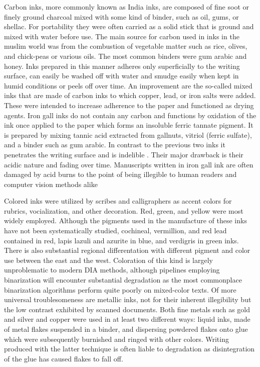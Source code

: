 Carbon inks, more commonly known as India inks, are composed of fine soot or
finely ground charcoal mixed with some kind of binder, such as oil, gums, or
shellac. For portability they were often carried as a solid stick that is
ground and mixed with water before use. The main source for carbon used in inks
in the muslim world was from the combustion of vegetable matter such as rice,
olives, and chick-peas or various oils. The most common binders were gum arabic
and honey\cite[pg. 133]{gacek2009arabic}. Inks prepared in this manner adheres
only superficially to the writing surface, can easily be washed off with water
and smudge easily when kept in humid conditions or peels off over time. An
improvement are the so-called mixed inks that are made of carbon inks to which
copper, lead, or iron salts were added. These were intended to increase
adherence to the paper and functioned as drying agents. Iron gall inks do not
contain any carbon and functions by oxidation of the ink once applied to the
paper which forms an insoluble ferric tannate pigment. It is prepared by mixing
tannic acid extracted from gallnuts, vitriol (ferric sulfate), and a binder
such as gum arabic. In contrast to the previous two inks it penetrates the
writing surface and is indelible \cite{christiansen2017manufacture}. Their
major drawback is their acidic nature and fading over time. Manuscripts written
in iron gall ink are often damaged by acid burns to the point of being
illegible to human readers and computer vision methods alike\cite[pg.
145]{gacek2009arabic}

Colored inks were utilized by scribes and calligraphers as accent colors for
rubrics, vocialization, and other decoration. Red, green, and yellow were most
widely employed. Although the pigments used in the manufacture of these inks
have not been systematically studied, cochineal, vermillion, and red lead
contained in red, lapis lazuli and azurite in blue, and verdigris in green
inks. There is also substantial regional differentation with different pigment
and color use between the east and the west\cite[pg. 63]{blair2006islamic}.
Coloration of this kind is largely unproblematic to modern DIA methods,
although pipelines employing binarization will encounter substantial
degradation as the most commonplace binarization algorithms perform quite
poorly on mixed-color texts. Of more universal troublesomeness are metallic
inks, not for their inherent illegibility but the low contrast exhibited by
scanned documents. Both fine metals such as gold and silver and copper were
used in at least two different ways: liquid inks, made of metal flakes
suspended in a binder\cite[pg. 225-227]{raggetti2019inks}, and dispersing
powdered flakes onto glue which were subsequently burnished and ringed with
other colors. Writing produced with the latter technique is often liable to
degradation as disintegration of the glue has caused flakes to fall
off\cite[pg.  63]{blair2006islamic}.

